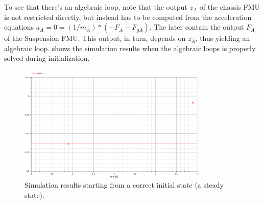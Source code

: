To see that there's an algebraic loop, note that the output $z_A$ of the chassis FMU is not restricted directly, but instead has to be computed from the acceleration equations $a_A = 0 = (1/m_A) * (- F_A - F_{gA})$.
The later contain the output $F_A$ of the Suspension FMU.
This output, in turn, depends on $z_A$, thus yielding an algebraic loop.
 shows the simulation results when the algebraic loops is properly solved during initialization.

\begin{figure}[htb]
    \centering
    \includegraphics[width=0.8\textwidth]{images/init_state_correct_sim.png}
    \caption{Simulation results starting from a correct initial state (a steady state). }
    \label{fig:init_state_correct_sim}
\end{figure}

